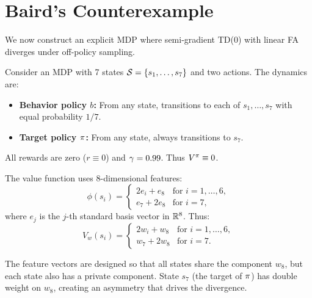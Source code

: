 \documentclass[11pt,a4paper]{article}
\begin{document}
\section{Baird's Counterexample}
\label{sec:baird}

We now construct an explicit MDP where semi-gradient TD(0) with
linear FA diverges under off-policy sampling.

\begin{definition}
\label{def:baird}
Consider an MDP with 7 states $\mathcal{S} = \{s_1, \ldots, s_7\}$ and
two actions. The dynamics are:
\begin{itemize}[nosep]
  \item \textbf{Behavior policy $b$:} From any state, transitions
    to each of $s_1, \ldots, s_7$ with equal probability $1/7$.
  \item \textbf{Target policy $\pi$:} From any state, always
    transitions to $s_7$.
\end{itemize}
All rewards are zero ($r \equiv 0$) and $\gamma = 0.99$. Thus
$V^\pi \equiv 0$.
\end{definition}

\begin{definition}
\label{def:baird_features}
The value function uses 8-dimensional features:
\begin{equation}
  \phi(s_i) = \begin{cases}
    2e_i + e_8 & \text{for } i = 1, \ldots, 6, \\
    e_7 + 2e_8 & \text{for } i = 7,
  \end{cases}
  \label{eq:baird_features}
\end{equation}
where $e_j$ is the $j$-th standard basis vector in $\mathbb{R}^8$. Thus:
\begin{equation}
  V_w(s_i) = \begin{cases}
    2w_i + w_8 & \text{for } i = 1, \ldots, 6, \\
    w_7 + 2w_8 & \text{for } i = 7.
  \end{cases}
  \label{eq:baird_values}
\end{equation}
\end{definition}

\begin{remark}
\label{rem:features}
The feature vectors are designed so that all states share the
component $w_8$, but each state also has a private component.
State $s_7$ (the target of $\pi$) has double weight on $w_8$,
creating an asymmetry that drives the divergence.
\end{remark}
\end{document}
